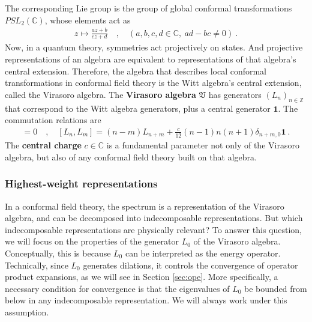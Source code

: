 \documentclass[12pt, a4paper]{article}
\theoremstyle{break}
\begin{document}
The corresponding Lie group is the group of global conformal transformations $PSL_2(\mathbb{C})$, whose elements act as 
\begin{align}
 z \mapsto \frac{az+b}{cz+d}\quad , \quad (a,b,c,d\in \mathbb{C},\ ad-bc\neq 0)\ .
\end{align}
Now, in a quantum theory, symmetries act projectively on states. And projective representations of an algebra are equivalent to representations of that algebra's central extension. Therefore, the algebra that describes local conformal transformations in conformal field theory is the Witt algebra's central extension, called the Virasoro algebra. The \textbf{Virasoro algebra} $\mathfrak{V}$ has generators $(L_n)_{n\in\mathbb{Z}}$ that correspond to the Witt algebra generators, plus a central generator $\mathbf 1$. The commutation relations are 
 \begin{align}
  [\mathbf 1, L_n] = 0 \quad , \quad \boxed{[L_n,L_m] = (n-m)L_{n+m} +\frac{c}{12}(n-1)n(n+1)\delta_{n+m,0}\mathbf 1} \ .
  \label{vir}
 \end{align}
 The \textbf{central charge} $c\in\mathbb{C}$ is a fundamental parameter not only of the Virasoro algebra, but also of any conformal field theory built on that algebra. 

\subsubsection{Highest-weight representations}

In a conformal field theory, the spectrum is a representation of the Virasoro algebra, and can be decomposed into indecomposable representations. But which indecomposable representations are physically relevant? To answer this question, we will focus on the properties of the generator $L_0$ of the Virasoro algebra. Conceptually, this is because $L_0$ can be interpreted as the energy operator. Technically, since $L_0$ generates dilations, it controls the convergence of operator product expansions, as we will see in Section \ref{sec:ope}. More specifically, a necessary condition for convergence is that the eigenvalues of $L_0$ be bounded from below in any indecomposable representation. We will always work under this assumption.

\end{document}
